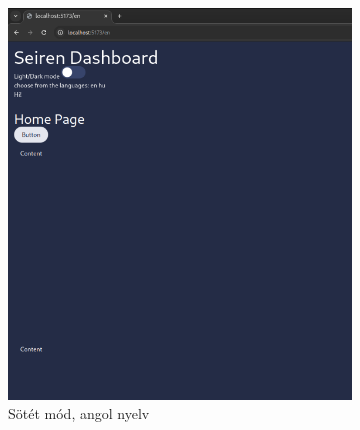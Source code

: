 \documentclass[a4paper]{article}
\begin{document}
\begin{figure}[ht]
    \centering
    \begin{subfigure}[b]{0.45\textwidth}
        \centering
        \includegraphics[width=\textwidth]{images/dark_preview.png}
        \caption{Sötét mód, angol nyelv}
        \label{fig:dark_mode}
    \end{subfigure}
    \hfill
    \begin{subfigure}[b]{0.45\textwidth}
        \centering

\end{subfigure}
\end{figure}
\end{document}
